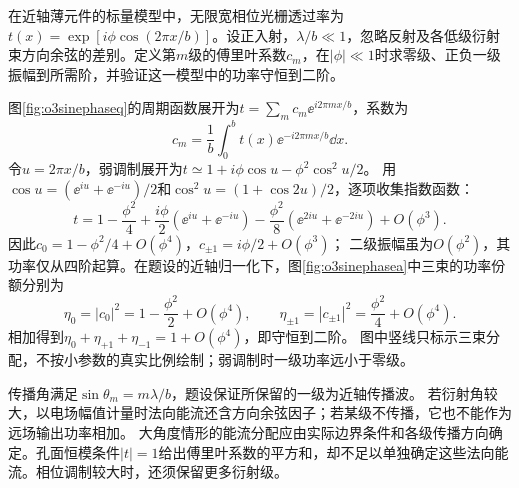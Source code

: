 \begin{exercise}\label{ex:o3sinusoidalphase}
在近轴薄元件的标量模型中，无限宽相位光栅透过率为$t(x)=\exp[i\phi\cos(2\pi x/b)]$。设正入射，$\lambda/b\ll1$，忽略反射及各低级衍射束方向余弦的差别。定义第$m$级的傅里叶系数$c_m$，在$|\phi|\ll1$时求零级、正负一级振幅到所需阶，并验证这一模型中的功率守恒到二阶。
\end{exercise}
\begin{solution}
图\ref{fig:o3sinephaseq}的周期函数展开为$t=\sum_mc_m\ee^{i2\pi mx/b}$，系数为
\[
 c_m=\frac1b\int_0^bt(x)\ee^{-i2\pi mx/b}\dd x.
\]
令$u=2\pi x/b$，弱调制展开为$t\simeq1+i\phi\cos u-\phi^2\cos^2u/2$。
用$\cos u=(\ee^{iu}+\ee^{-iu})/2$和$\cos^2u=(1+\cos2u)/2$，逐项收集指数函数：
\[
 t=1-\frac{\phi^2}{4}
 +\frac{i\phi}{2}(\ee^{iu}+\ee^{-iu})
 -\frac{\phi^2}{8}(\ee^{2iu}+\ee^{-2iu})+O(\phi^3).
\]
因此$c_0=1-\phi^2/4+O(\phi^4)$，$c_{\pm1}=i\phi/2+O(\phi^3)$；
二级振幅虽为$O(\phi^2)$，其功率仅从四阶起算。在题设的近轴归一化下，图\ref{fig:o3sinephasea}中三束的功率份额分别为
\[
 \eta_0=|c_0|^2=1-\frac{\phi^2}{2}+O(\phi^4),\qquad
 \eta_{\pm1}=|c_{\pm1}|^2=\frac{\phi^2}{4}+O(\phi^4).
\]
相加得到$\eta_0+\eta_{+1}+\eta_{-1}=1+O(\phi^4)$，即守恒到二阶。
图中竖线只标示三束分配，不按小参数的真实比例绘制；弱调制时一级功率远小于零级。

传播角满足$\sin\theta_m=m\lambda/b$，题设保证所保留的一级为近轴传播波。
若衍射角较大，以电场幅值计量时法向能流还含方向余弦因子；若某级不传播，它也不能作为远场输出功率相加。
大角度情形的能流分配应由实际边界条件和各级传播方向确定。孔面恒模条件$|t|=1$给出傅里叶系数的平方和，却不足以单独确定这些法向能流。相位调制较大时，还须保留更多衍射级。
\end{solution}
